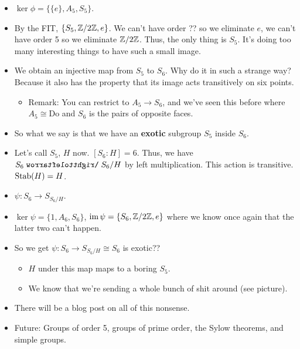 \documentclass[../notes.tex]{subfiles}
\begin{document}
\begin{itemize}
    \item $\ker\phi=\{\{e\},A_5,S_5\}$.
    \item By the FIT, $\{S_5,\mathbb{Z}/2\mathbb{Z},e\}$. We can't have order ?? so we eliminate $e$, we can't have order 5 so we eliminate $\mathbb{Z}/2\mathbb{Z}$. Thus, the only thing is $S_5$. It's doing too many interesting things to have such a small image.
    \item We obtain an injective map from $S_5$ to $S_6$. Why do it in such a strange way? Because it also has the property that its image acts transitively on six points.
    \begin{itemize}
        \item Remark: You can restrict to $A_5\to S_6$, and we've seen this before where $A_5\cong\text{Do}$ and $S_6$ is the pairs of opposite faces.
    \end{itemize}
    \item So what we say is that we have an \textbf{exotic} subgroup $S_5$ inside $S_6$.
    \item Let's call $S_5$, $H$ now. $[S_6:H]=6$. Thus, we have $S_6\acts S_6/H$ by left multiplication. This action is transitive. $\operatorname{Stab}(H)=H$.
    \item $\psi:S_6\to S_{S_6/H}$.
    \item $\ker\psi=\{1,A_6,S_6\}$, $\operatorname{im}\psi=\{S_6,\mathbb{Z}/2\mathbb{Z},e\}$ where we know once again that the latter two can't happen.
    \item So we get $\psi:S_6\to S_{S_6/H}\cong S_6$ is exotic??
    \begin{itemize}
        \item $H$ under this map maps to a boring $S_5$.
        \item We know that we're sending a whole bunch of shit around (see picture).
    \end{itemize}
    \item There will be a blog post on all of this nonsense.
    \item Future: Groups of order 5, groups of prime order, the Sylow theorems, and simple groups.
\end{itemize}
\end{document}
